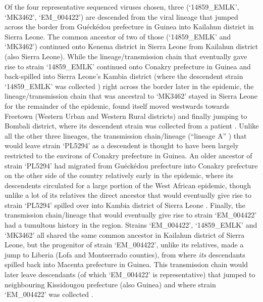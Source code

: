 \documentclass[11pt,oneside,letterpaper]{article}
\begin{document}
Of the four representative sequenced viruses chosen, three (`14859\_EMLK', `MK3462', `EM\_004422') are descended from the viral lineage that jumped across the border from Gu\'{e}ck\'{e}dou prefecture in Guinea into Kailahun district in Sierra Leone.
The common ancestor of two of those (`14859\_EMLK' and `MK3462') continued onto Kenema district in Sierra Leone from Kailahun district (also Sierra Leone).
While the lineage/transmission chain that eventually gave rise to strain `14859\_EMLK' continued onto Conakry prefecture in Guinea and back-spilled into Sierra Leone's Kambia district (where the descendent strain `14859\_EMLK' was collected \citep{arias_rapid_2016}) right across the border later in the epidemic, the lineage/transmission chain that was ancestral to `MK3462' stayed in Sierra Leone for the remainder of the epidemic, found itself moved westwards towards Freetown (Western Urban and Western Rural districts) and finally jumping to Bombali district, where its descendent strain was collected from a patient \citep{arias_rapid_2016}.
Unlike all the other three lineages, the transmission chain/lineage (``lineage A'' \citep{carroll_temporal_2015}) that would leave strain `PL5294' as a descendent is thought to have been largely restricted to the environs of Conakry prefecture in Guinea.
An older ancestor of strain `PL5294' had migrated from Gu\'{e}ck\'{e}dou prefecture into Conakry prefecture on the other side of the country relatively early in the epidemic, where its descendents circulated for a large portion of the West African epidemic, though unlike a lot of its relatives the direct ancestor that would eventually give rise to strain `PL5294' spilled over into Kambia district of Sierra Leone \citep{arias_rapid_2016}.
Finally, the transmission chain/lineage that would eventually give rise to strain `EM\_004422' had a tumultous history in the region.
Strains `EM\_004422', `14859\_EMLK' and `MK3462' all shared the same common ancestor in Kailahun district of Sierra Leone, but the progenitor of strain `EM\_004422', unlike its relatives, made a jump to Liberia (Lofa and Montserrado counties), from where \textit{its} descendants spilled back into Macenta prefecture in Guinea.
This transmission chain would later leave descendants (of which `EM\_004422' is representative) that jumped to neighbouring Kissidougou prefecture (also Guinea) and where strain `EM\_004422' was collected \citep{carroll_temporal_2015}.
\end{document}
